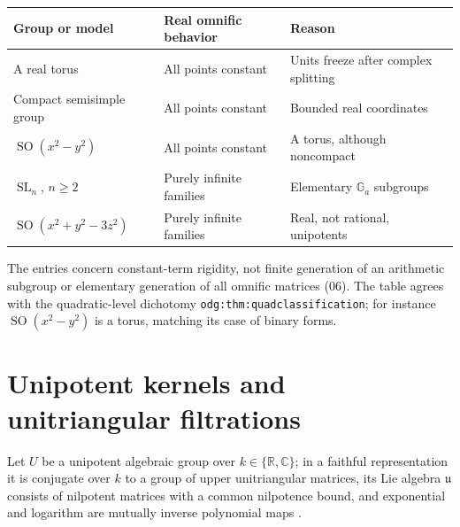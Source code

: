 \documentclass[11pt,oneside]{article}
\numberwithin{equation}{section}
\theoremstyle{definition}
\theoremstyle{remark}
\newcommand{\R}{\mathbb R}
\newcommand{\C}{\mathbb C}
\newcommand{\Ga}{\mathbb G_a}
\newcommand{\SL}{\operatorname{SL}}
\newcommand{\SO}{\operatorname{SO}}
\newcommand{\replabel}[1]{\nolinkurl{#1}}
\begin{document}
\begin{center}
\renewcommand{\arraystretch}{1.15}
\begin{tabular}{>{\raggedright\arraybackslash}p{}>{\raggedright\arraybackslash}p{}>{\raggedright\arraybackslash}p{}}
\toprule
Group or model & Real omnific behavior & Reason\\
\midrule
A real torus & All points constant & Units freeze after complex splitting\\
Compact semisimple group & All points constant & Bounded real coordinates\\
$\SO(x^2-y^2)$ & All points constant & A torus, although noncompact\\
$\SL_n$, $n\ge2$ & Purely infinite families & Elementary $\Ga$ subgroups\\
$\SO(x^2+y^2-3z^2)$ & Purely infinite families & Real, not rational, unipotents\\
\bottomrule
\end{tabular}
\end{center}
The entries concern constant-term rigidity, not finite generation of an
arithmetic subgroup or elementary generation of all omnific matrices (06). The
table agrees with the quadratic-level dichotomy \replabel{odg:thm:quadclassification};
for instance $\SO(x^2-y^2)$ is a torus, matching its case of binary forms.

\section{Unipotent kernels and unitriangular filtrations}\label{ogl:alg:sec:unipotent}

Let $U$ be a unipotent algebraic group over $k\in\{\R,\C\}$; in a faithful
representation it is conjugate over $k$ to a group of upper unitriangular
matrices, its Lie algebra $\mathfrak u$ consists of nilpotent matrices with a
common nilpotence bound, and exponential and logarithm are mutually inverse
polynomial maps \cite[Proposition~14.32]{MilneAG}.
\end{document}
